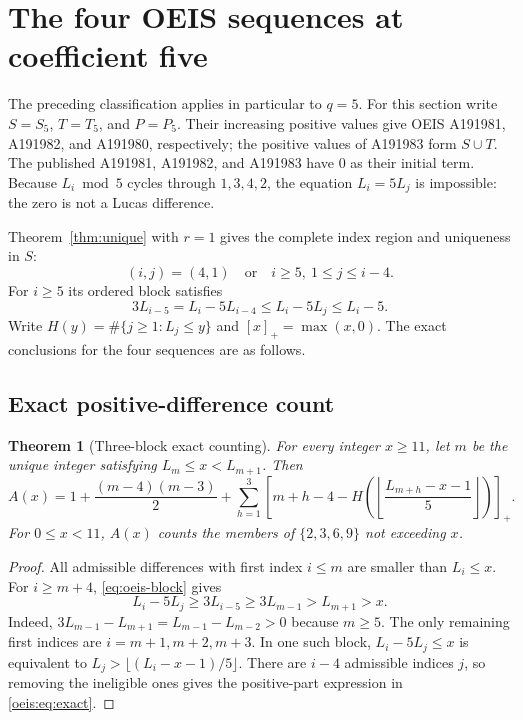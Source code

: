 \documentclass[11pt]{article}
\newtheorem{theorem}{Theorem}[section]
\begin{document}
\section{The four OEIS sequences at coefficient five}
The preceding classification applies in particular to \(q=5\).
For this section write \(S=S_5\), \(T=T_5\),
and \(P=P_5\). Their increasing positive values
give OEIS A191981, A191982, and A191980,
respectively; the positive values of A191983 form
\(S\cup T\). The published A191981, A191982, and A191983
have $0$ as their initial term. Because
\(L_i\bmod5\) cycles through \(1,3,4,2\),
the equation \(L_i=5L_j\) is impossible:
the zero is not a Lucas difference.

Theorem~\ref{thm:unique} with \(r=1\) gives
the complete index region and uniqueness in \(S\):
\[
(i,j)=(4,1)\quad\text{or}\quad
i\ge5,\ 1\le j\le i-4.
\]
For \(i\ge5\) its ordered block satisfies
\begin{equation}\label{eq:oeis-block}
3L_{i-5}=L_i-5L_{i-4}
\le L_i-5L_j\le L_i-5.
\end{equation}
Write \(H(y)=\#\{j\ge1:L_j\le y\}\) and
\([x]_+=\max(x,0)\). The exact conclusions
for the four sequences are as follows.

\subsection{Exact positive-difference count}
\begin{theorem}[Three-block exact counting]\label{oeis:thm:exact}
For every integer $x\ge11$, let $m$ be the unique integer satisfying
$L_m\le x<L_{m+1}$. Then
\begin{equation}\label{oeis:eq:exact}
\boxed{\displaystyle A(x)=1+\frac{(m-4)(m-3)}2+
\sum_{h=1}^{3}\left[m+h-4-
H\!\left(\left\lfloor\frac{L_{m+h}-x-1}{5}\right\rfloor\right)
\right]_+.}
\end{equation}
For $0\le x<11$, $A(x)$ counts the members of $\{2,3,6,9\}$ not exceeding $x$.
\end{theorem}
\begin{proof}
All admissible differences with first index $i\le m$ are smaller than
$L_i\le x$. For $i\ge m+4$, \eqref{eq:oeis-block} gives
\[
L_i-5L_j\ge3L_{i-5}\ge3L_{m-1}>L_{m+1}>x.
\]
Indeed, $3L_{m-1}-L_{m+1}=L_{m-1}-L_{m-2}>0$ because $m\ge5$.
The only remaining first indices are $i=m+1,m+2,m+3$. In one such block,
$L_i-5L_j\le x$ is equivalent to
$L_j>\lfloor(L_i-x-1)/5\rfloor$.
There are $i-4$ admissible indices $j$, so removing the ineligible ones gives
the positive-part expression in \eqref{oeis:eq:exact}.
\end{proof}
\end{document}
